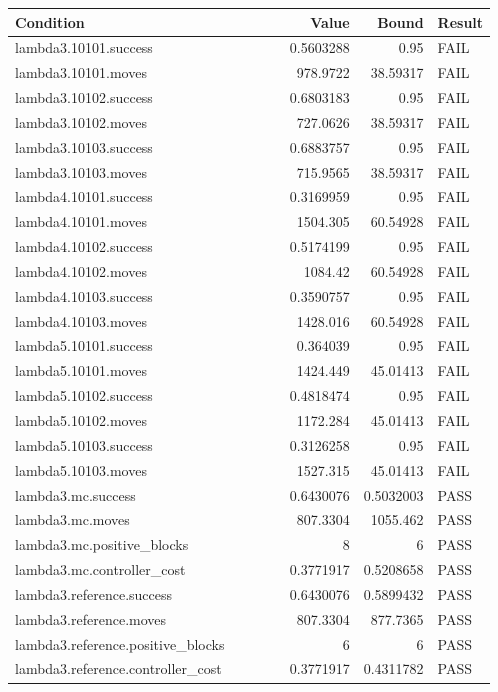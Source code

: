 \documentclass[10pt]{article}
\begin{document}
{\small\begin{longtable}{p{0.58\linewidth}rrl}\toprule Condition & Value & Bound & Result \\ \midrule\endhead
lambda3.10101.success & 0.5603288 & 0.95 & FAIL \\
lambda3.10101.moves & 978.9722 & 38.59317 & FAIL \\
lambda3.10102.success & 0.6803183 & 0.95 & FAIL \\
lambda3.10102.moves & 727.0626 & 38.59317 & FAIL \\
lambda3.10103.success & 0.6883757 & 0.95 & FAIL \\
lambda3.10103.moves & 715.9565 & 38.59317 & FAIL \\
lambda4.10101.success & 0.3169959 & 0.95 & FAIL \\
lambda4.10101.moves & 1504.305 & 60.54928 & FAIL \\
lambda4.10102.success & 0.5174199 & 0.95 & FAIL \\
lambda4.10102.moves & 1084.42 & 60.54928 & FAIL \\
lambda4.10103.success & 0.3590757 & 0.95 & FAIL \\
lambda4.10103.moves & 1428.016 & 60.54928 & FAIL \\
lambda5.10101.success & 0.364039 & 0.95 & FAIL \\
lambda5.10101.moves & 1424.449 & 45.01413 & FAIL \\
lambda5.10102.success & 0.4818474 & 0.95 & FAIL \\
lambda5.10102.moves & 1172.284 & 45.01413 & FAIL \\
lambda5.10103.success & 0.3126258 & 0.95 & FAIL \\
lambda5.10103.moves & 1527.315 & 45.01413 & FAIL \\
lambda3.mc.success & 0.6430076 & 0.5032003 & PASS \\
lambda3.mc.moves & 807.3304 & 1055.462 & PASS \\
lambda3.mc.positive\_blocks & 8 & 6 & PASS \\
lambda3.mc.controller\_cost & 0.3771917 & 0.5208658 & PASS \\
lambda3.reference.success & 0.6430076 & 0.5899432 & PASS \\
lambda3.reference.moves & 807.3304 & 877.7365 & PASS \\
lambda3.reference.positive\_blocks & 6 & 6 & PASS \\
lambda3.reference.controller\_cost & 0.3771917 & 0.4311782 & PASS \\

\end{longtable}}
\end{document}
